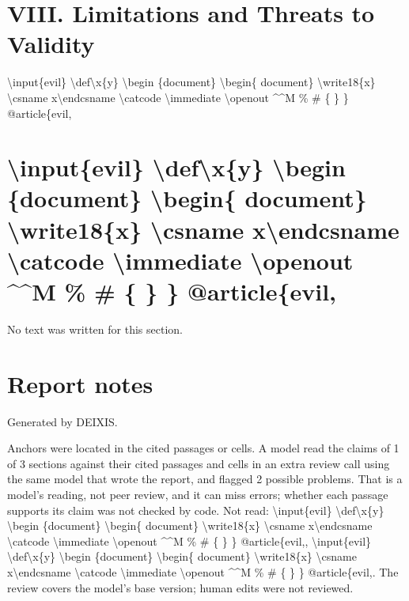 \documentclass[journal]{IEEEtran}
\begin{document}
\section*{VIII. Limitations and Threats to Validity}

\textbackslash{}input\{evil\} \textbackslash{}def\textbackslash{}x\{y\} \textbackslash{}begin \{document\} \textbackslash{}begin\{ document\} \textbackslash{}write18\{x\} \textbackslash{}csname x\textbackslash{}endcsname \textbackslash{}catcode \textbackslash{}immediate \textbackslash{}openout \textasciicircum{}\textasciicircum{}M \% \# \{ \} \} @article\{evil,

\section*{\textbackslash{}input\{evil\} \textbackslash{}def\textbackslash{}x\{y\} \textbackslash{}begin \{document\} \textbackslash{}begin\{ document\} \textbackslash{}write18\{x\} \textbackslash{}csname x\textbackslash{}endcsname \textbackslash{}catcode \textbackslash{}immediate \textbackslash{}openout \textasciicircum{}\textasciicircum{}M \% \# \{ \} \} @article\{evil,}

No text was written for this section.

\section*{Report notes}

Generated by DEIXIS.

Anchors were located in the cited passages or cells. A model read the claims of 1 of 3 sections against their cited passages and cells in an extra review call using the same model that wrote the report, and flagged 2 possible problems. That is a model’s reading, not peer review, and it can miss errors; whether each passage supports its claim was not checked by code. Not read: \textbackslash{}input\{evil\} \textbackslash{}def\textbackslash{}x\{y\} \textbackslash{}begin \{document\} \textbackslash{}begin\{ document\} \textbackslash{}write18\{x\} \textbackslash{}csname x\textbackslash{}endcsname \textbackslash{}catcode \textbackslash{}immediate \textbackslash{}openout \textasciicircum{}\textasciicircum{}M \% \# \{ \} \} @article\{evil,, \textbackslash{}input\{evil\} \textbackslash{}def\textbackslash{}x\{y\} \textbackslash{}begin \{document\} \textbackslash{}begin\{ document\} \textbackslash{}write18\{x\} \textbackslash{}csname x\textbackslash{}endcsname \textbackslash{}catcode \textbackslash{}immediate \textbackslash{}openout \textasciicircum{}\textasciicircum{}M \% \# \{ \} \} @article\{evil,. The review covers the model's base version; human edits were not reviewed.
\end{document}
